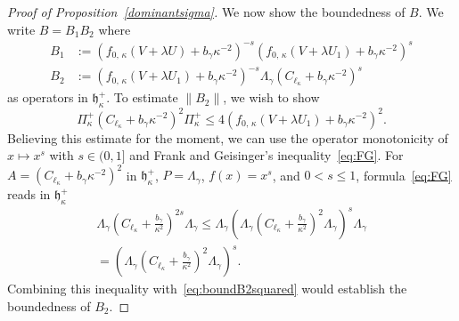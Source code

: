 \documentclass[10pt]{amsart}
\theoremstyle{definition}
\newcommand*\gh{\mathfrak{h}}
\newcommand*\ghpk{{\gh^+_\kappa}}
\newcommand*\ppp{\Pi^+_\kappa}
\begin{document}
\begin{proof}[Proof of Proposition~\ref{dominantsigma}]
We now show the boundedness of $B$. We write $B=B_1B_2$ where
\begin{align*}
B_1 & := \left(f_{0,\,\kappa}\left(V+\lambda U\right)+b_\gamma\kappa^{-2}\right)^{-s} \left(f_{0,\,\kappa}\left(V+\lambda U_1\right)+b_\gamma\kappa^{-2}\right)^s\\
B_2 & := \left(f_{0,\,\kappa}\left(V+\lambda U_1\right)+b_\gamma\kappa^{-2}\right)^{-s}\Lambda_\gamma\left(C_{\ell_\kappa}+b_\gamma\kappa^{-2}\right)^s
\end{align*}
as operators in $\ghpk$. To estimate $\|B_2\|$, we wish to show
\begin{equation}\label{eq:boundB2squared}
\ppp\left(C_{\ell_\kappa}+b_\gamma\kappa^{-2}\right)^{2}\ppp
\leq 4\left(f_{0,\,\kappa}\left(V+\lambda U_1\right)+b_\gamma\kappa^{-2}\right)^{2}.
\end{equation}
Believing this estimate for the moment, we can use the operator monotonicity of $x\mapsto x^{s}$ with $s\in(0,1]$ and Frank and Geisinger's inequality~\eqref{eq:FG}. For $A=(C_{\ell_\kappa}+b_\gamma\kappa^{-2})^2$ in $\ghpk$, $P=\Lambda_\gamma$, $f(x)=x^s$, and $0<s\leq1$, formula~\eqref{eq:FG} reads in $\ghpk$
\begin{multline}\label{eq:SDgen}
\Lambda_\gamma \left(C_{\ell_\kappa}+\frac{b_\gamma}{\kappa^2}\right)^{2s}\Lambda_\gamma
\leq \Lambda_\gamma\left(\Lambda_\gamma\left(C_{\ell_\kappa}+\frac{b_\gamma}{\kappa^2}\right)^2\Lambda_\gamma\right)^s\Lambda_\gamma \\= \left(\Lambda_\gamma\left(C_{\ell_\kappa}+\frac{b_\gamma}{\kappa^2}\right)^2\Lambda_\gamma\right)^s.
\end{multline}
Combining this inequality with~\eqref{eq:boundB2squared} would establish the boundedness of $B_2$.


\end{proof}
\end{document}
